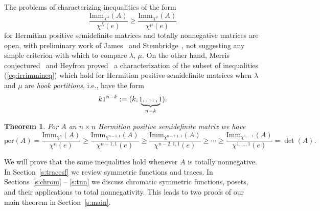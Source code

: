 \documentclass[12pt]{amsart}
\newtheorem{thm}{Theorem}[section]
\numberwithin{equation}{section}
\newcommand{\sn}{\mathfrak{S}_n}
\newcommand{\imm}[1]{\mathrm{Imm}_{#1}}
\newcommand{\defeq}{:=}
\newcommand{\ntksp}{\negthickspace}
\newcommand{\perm}{\mathrm{per}}
\begin{document}
The problems of characterizing inequalities of the form
\begin{equation}\label{eq:irrimmineq}
  \frac{\imm{\chi^\lambda}(A)}{\chi^\lambda(e)}
  \geq
  \frac{\imm{\chi^\mu}(A)}{\chi^\mu(e)}
\end{equation}
for Hermitian positive semidefinite matrices and totally nonnegative matrices
are open,
with preliminary work of James~\cite[Appendix]{JamesImm}
and Stembridge~\cite[\S 3]{StemConj},
not suggesting any simple criterion with which to compare
$\lambda$, $\mu$.
On the other hand,
Merris conjectured~\cite[\S 4]{MerrisSingleHook}
and Heyfron proved~\cite[Thm.\,1]{HeyfronImmDom}
a characterization of
the subset of inequalities (\ref{eq:irrimmineq})
which hold for Hermitian positive semidefinite matrices
when $\lambda$ and $\mu$ are {\em hook partitions}, i.e., have
the form
\begin{equation*}
  k1^{n-k} \defeq
  (k, \; \underbrace{\ntksp 1, \dotsc, 1 \ntksp }_{n-k}\;).
  \end{equation*}
\begin{thm}\label{t:heyfron}
  For $A$ an $n \times n$ Hermitian positive semidefinite matrix we have
\begin{equation*}%
   \perm(A)=\frac{\imm{\chi^n}(A)}{\chi^{n}(e)}\geq \frac{\imm{\chi^{n-1,1}}(A)}{\chi^{n-1,1}(e)}\geq \frac{\imm{\chi^{ n-2,1,1}}(A)}{\chi^{n-2,1,1}(e)}\geq \cdots \geq \frac{\imm{\chi^{1,\dotsc,1}}(A)}{\chi^{1,\dotsc,1}(e)}=\det(A).
\end{equation*} 
\end{thm}
We will prove that the same inequalities hold
whenever $A$ is totally nonnegative.
In Section~\ref{s:tracesf} we review symmetric functions and traces.
In Sections~\ref{s:chrom} -- \ref{s:tnn}
we discuss chromatic symmetric functions, posets,
and their applications to total nonnegativity.
This leads to two proofs of our main theorem in Section~\ref{s:main}.



\end{document}
